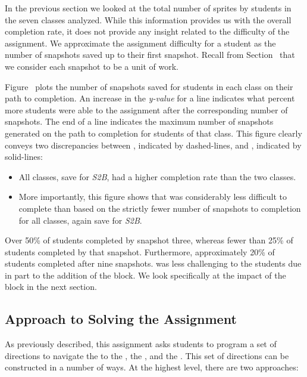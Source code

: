 In the previous section we looked at the total number of sprites \caught{} by
students in the seven classes analyzed. While this information provides us with
the overall completion rate, it does not provide any insight related to the
difficulty of the assignment. We approximate the assignment difficulty for a
student as the number of snapshots saved up to their first \com{}
snapshot. Recall from Section~ that we consider each
snapshot to be a unit of work.

Figure~ plots the number of snapshots
saved for students in each class on their path to completion. An increase in
the \emph{y-value} for a line indicates what percent more students were able to
\com{} the assignment after the corresponding number of snapshots. The end of a
line indicates the maximum number of snapshots generated on the path to
completion for students of that class. This figure clearly conveys two
discrepancies between \sone{}, indicated by dashed-lines, and \stwo{},
indicated by solid-lines:

\begin{itemize}
\item All \stwo{} classes, save for \emph{S2B}, had a higher completion rate
  than the two \sone{} classes.
\item More importantly, this figure shows that \stwo{} was considerably less
  difficult to complete than \sone{} based on the strictly fewer number of
  snapshots to completion for all \stwo{} classes, again save for \emph{S2B}.
\end{itemize}

Over 50\% of \stwo{} students completed by snapshot three, whereas fewer than
25\% of \sone{} students completed by that snapshot. Furthermore, approximately
20\% of \sone{} students completed after nine snapshots. \stwo{} was less
challenging to the students due in part to the addition of the \glideto{}
block. We look specifically at the impact of the \glideto{} block in the next
section.

\subsection{Approach to Solving the Assignment}
As previously described, this assignment asks students to program a set of
directions to navigate the \net{} to \catch{} the \bear{}, the \horse{},
and the \zebra{}. This set of directions can be constructed in a number of
ways. At the highest level, there are two approaches:


